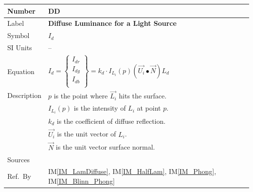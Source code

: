 \documentclass[12pt]{article}
\newcommand{\colAwidth}{0.13\textwidth}
\newcommand{\colBwidth}{0.82\textwidth}
\newcounter{defnum} %
\newcounter{datadefnum} %
\newcommand{\iref}[1]{IM\ref{#1}}
\begin{document}
\noindent
\begin{minipage}{\textwidth}
	\renewcommand*{\arraystretch}{1.5}
	\begin{tabular}{| p{\colAwidth} | p{\colBwidth}|}
		\hline
		\rowcolor[gray]{0.9}
		Number& DD{datadefnum}\thedatadefnum 
		\label{DD_Intensity_diffuse}\\
		\hline
		Label& \bf Diffuse Luminance for a Light Source\\
		\hline
		Symbol &$I_{d}$\\
		\hline
		SI Units & --\\
		\hline
		Equation&$I_{d} = \begin{Bmatrix}
		I_{dr} \\ I_{dg} \\ I_{db} \\
		\end{Bmatrix} = k_{d}\cdot I_{L_{i}}(p)(\vec{U_{i}}\bullet \vec{N}) 
		L_{d}$\\
		\hline
		Description & $p$ is the point where $\vec{L_{i}}$ hits the surface.
		\\
		& $I_{L_{i}}(p)$ is the intensity of $L_{i}$ at point $p$. \\
		& $k_{d}$ is the coefficient of diffuse reflection. \\
		& $\vec{U_{i}}$ is the unit vector of $L_{i}$. \\
		& $\vec{N}$ is the unit vector surface normal. \\
		\hline
		Sources& \cite{shreiner2012}\\
		\hline
		Ref.\ By & \iref{IM_LamDiffuse}, \iref{IM_HalfLam}, \iref{IM_Phong}, 
		\iref{IM_Blinn_Phong} \\
		\hline
	\end{tabular}
\end{minipage}\\

~\newline
\end{document}

